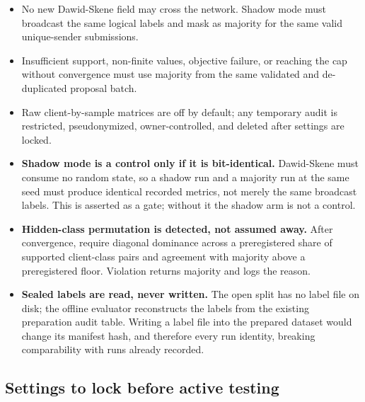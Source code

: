 \documentclass[10pt,a4paper]{article}
\begin{document}
\begin{itemize}
  \item No new Dawid-Skene field may cross the network. Shadow mode must broadcast the same logical
        labels and mask as majority for the same valid unique-sender submissions.
  \item Insufficient support, non-finite values, objective failure, or reaching the cap without
        convergence must use majority from the same validated and de-duplicated proposal batch.
  \item Raw client-by-sample matrices are off by default; any temporary audit is restricted,
        pseudonymized, owner-controlled, and deleted after settings are locked.
  \item \textbf{Shadow mode is a control only if it is bit-identical.} Dawid-Skene must consume no
        random state, so a shadow run and a majority run at the same seed must produce identical
        recorded metrics, not merely the same broadcast labels. This is asserted as a gate; without
        it the shadow arm is not a control.
  \item \textbf{Hidden-class permutation is detected, not assumed away.} After convergence, require
        diagonal dominance across a preregistered share of supported client-class pairs and agreement
        with majority above a preregistered floor. Violation returns majority and logs the reason.
  \item \textbf{Sealed labels are read, never written.} The open split has no label file on disk; the
        offline evaluator reconstructs the labels from the existing preparation audit table. Writing a
        label file into the prepared dataset would change its manifest hash, and therefore every run
        identity, breaking comparability with runs already recorded.
\end{itemize}

\clearpage

\subsection{Settings to lock before active testing}
\end{document}
